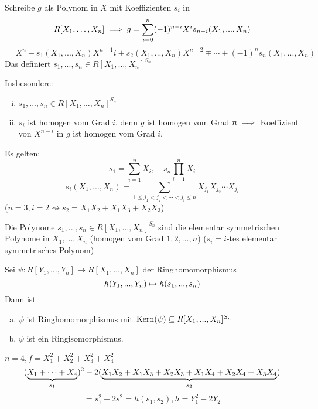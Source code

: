\documentclass[a4paper]{report}
\begin{document}
\begin{bem*}
  Schreibe $g$ als Polynom in $X$ mit Koeffizienten $s_{i}$ in
  \[R[X_{1}, \ldots, X_{n}] \implies g = \sum_{i=0}^n (-1)^{n-i}X^{i}s_{n-i}(X_{1},...,X_{n})\]
  \[ = X^{n} - s_{1}(X_{1}, ..., X_{n})X^{n-1}i + s_{2}(X_{1}, ..., X_{n})X^{n-2} \mp \cdots + (-1)^{n}s_{n}(X_{1}, ..., X_{n})\]
  Das definiert $s_{1}, ..., s_{n} \in R[X_{1}, \ldots, X_{n}]^{S_{n}}$
  \item Insbesondere:
  \begin{enumerate}[(i)]
    \item $s_{1}, ..., s_{n} \in R[X_{1}, \ldots, X_{n}]^{S_{n}}$
    \item $s_{i}$ ist homogen vom Grad $i$, denn $g$ ist homogen vom Grad $n \implies $ Koeffizient von $X^{n-i}$ in $g$ ist homogen vom Grad $i$.
  \end{enumerate}
\end{bem*}

\begin{ubng}
  Es gelten:
  \[s_{1} = \sum_{i=1}^n X_{i}, \quad s_{n} \prod_{i=1}^n X_{i}\]
  \[s_{i}(X_{1}, ..., X_{n}) = \sum_{1 \le j_{1} < j_{2} < \cdots < j_{i} \le n} X_{j_{1}}X_{j_{2}}\cdots X_{j_{i}}\]
  ($n=3, i = 2 \rightsquigarrow s_{2} = X_{1}X_{2} + X_{1}X_{3} + X_{2}X_{3}$)
\end{ubng}

\begin{defi}
Die Polynome $s_{1}, ..., s_{n} \in R[X_{1}, \ldots, X_{n}]^{S_{n}}$ sind die elementar symmetrischen Polynome in $X_{1}, ..., X_{n}$ (homogen vom Grad $1, 2, ..., n$) ($s_{i} = i$-tes elementar symmetrisches Polynom)
\end{defi}

\begin{satz}
  Sei $\psi: R[Y_{1}, \ldots, Y_{n}] \to R[X_{1}, \ldots, X_{n}]$ der Ringhomomorphismus \[h(Y_{1}, ..., Y_{n}) \mapsto h(s_{1}, ..., s_{n})\]
  Dann ist
  \begin{enumerate}[(a)]
    \item $\psi$ ist Ringhomomorphismus mit $\operatorname{Kern}(\psi) \subseteq R[X_{1}, ..., X_{n}]^{S_{n}}$
    \item $\psi$ ist ein Ringisomorphismus.
  \end{enumerate}
\end{satz}

\begin{bsp*}
  $n = 4, f = X_{1}^{2} + X_{2}^{2} + X_{3}^{2} + X_{4}^{2}$
  \[(\underbrace{X_{1} + \cdots + X_{4}}_{s_{1}})^{2} - 2(\underbrace{X_{1}X_{2} + X_{1}X_{3} + X_{2}X_{3} + X_{1}X_{4} + X_{2}X_{4} + X_{3}X_{4}}_{s_{2}})\]
  \[ = s_{1}^{2} - 2s^{2} = h(s_{1}, s_{2}), h = Y_{1}^{2} - 2Y_{2}\]
\end{bsp*}
\end{document}

